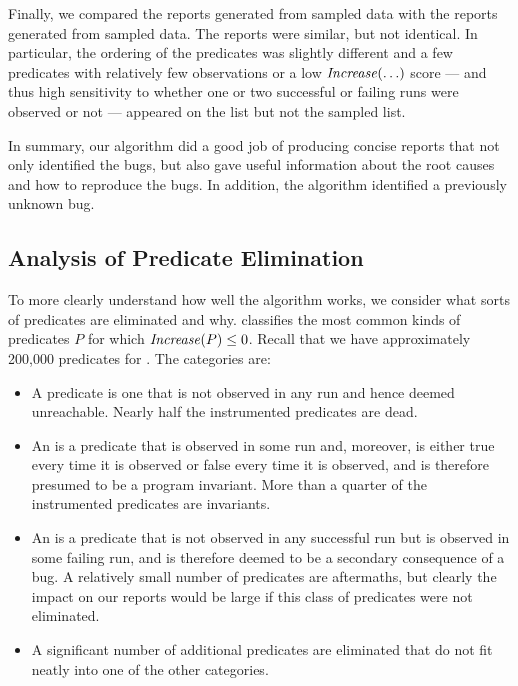 Finally, we compared the reports generated from  sampled data
with the reports generated from  sampled data.  The reports were
similar, but not identical.  In particular, the ordering of the
predicates was slightly different and a few predicates with relatively
few observations or a low $\mbox{\textit{Increase}}(\ldots)$ score --- and thus high
sensitivity to whether one or two successful or failing runs were
observed or not --- appeared on
the  list but not the  sampled list.

In summary, our algorithm did a good job of producing concise reports that not
only identified the bugs, but also gave useful information about the root causes and
how to reproduce the bugs.  In addition, the algorithm identified a previously unknown
bug.

\subsection{Analysis of Predicate Elimination}

To more clearly understand how well the algorithm works,
we consider what sorts of predicates are eliminated and why.
 classifies the most common kinds of predicates
$P$ for which $\mbox{\textit{Increase}}(P) \leq 0$.  Recall that we have
approximately 200,000 predicates for \moss.  The categories are:

\begin{itemize}
\item  A  predicate is one that is not observed in any run and hence
deemed unreachable.  Nearly half the instrumented predicates are dead.

\item An  is a predicate that is observed in some run and, moreover,
is either true every time it is observed or false every time it is observed,
and is therefore presumed to be a program invariant.  More than a quarter of
the instrumented predicates are invariants.

\item An  is a predicate that is not observed in any successful run but
is observed in some failing run, and is therefore deemed to be a secondary consequence
of a bug.  A relatively small number of predicates are aftermaths, but clearly
the impact on our reports would be large if this class of predicates were not eliminated.

\item A significant number of additional predicates are eliminated that do not fit
neatly into one of the other categories.

\end{itemize}

